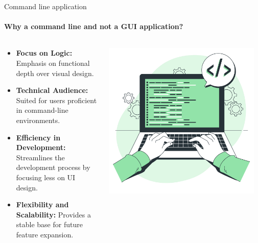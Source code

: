 \documentclass[
ngerman,%
authorontitle=true,
]{bfhbeamer}
\begin{document}
	
	\begin{frame}{Command line application}
		\framesubtitle{Why a command line and not a GUI application?}
		\begin{columns} %
			\begin{column}{0.7\textwidth} %
				\begin{itemize}
					\item \textbf{Focus on Logic:} Emphasis on functional depth over visual design.
					\item \textbf{Technical Audience:} Suited for users proficient in command-line environments.
					\item \textbf{Efficiency in Development:} Streamlines the development process by focusing less on UI design.
					\item \textbf{Flexibility and Scalability:} Provides a stable base for future feature expansion.
				\end{itemize}
			\end{column}
			\begin{column}{0.3\textwidth} %
				\begin{center}
					\includegraphics[width=0.95\textwidth]{pictures/final_presentation/cmd_2.jpg}
				\end{center}
			\end{column}
		\end{columns}
		
	\end{frame}
	
\end{document}
